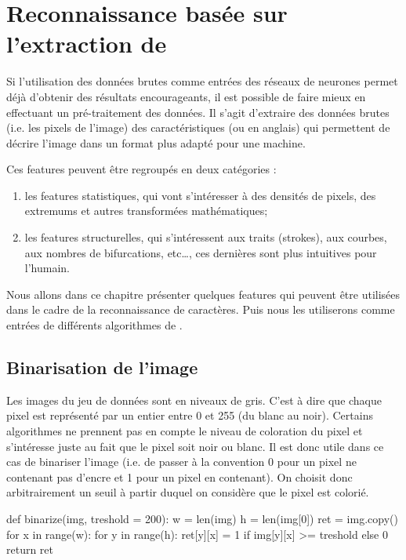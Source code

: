 
\chapter{Reconnaissance basée sur l'extraction de }
\label{chap:features}




Si l'utilisation des données brutes comme entrées des réseaux de neurones 
permet déjà d'obtenir des résultats encourageants, il est possible de faire 
mieux en effectuant un pré-traitement des données. 
Il s'agit d'extraire des données brutes (i.e.\/ les pixels de l'image) des 
caractéristiques (ou  en anglais) qui permettent de décrire 
l'image dans un format plus adapté pour une machine.

Ces features peuvent être regroupés en deux catégories : 
\begin{enumerate}
  \item les features statistiques, qui vont s'intéresser à des densités de pixels, 
  des extremums et autres transformées mathématiques;
  \item les features structurelles, qui s’intéressent aux traits (strokes), aux courbes,
  aux nombres de bifurcations, etc…, ces dernières sont plus intuitives pour l’humain.
\end{enumerate}

Nous allons dans ce chapitre présenter quelques features qui peuvent être 
utilisées dans le cadre de la reconnaissance de caractères. Puis nous les utiliserons 
comme entrées de différents algorithmes de .



\section{Binarisation de l'image}



Les images du jeu de données sont en niveaux de gris. 
C'est à dire que chaque pixel est représenté par un entier entre 0 
et 255 (du blanc au noir). 
Certains algorithmes ne prennent pas en compte le niveau de coloration 
du pixel et s'intéresse juste au fait que le pixel soit noir ou blanc. 
Il est donc utile dans ce cas de binariser l'image (i.e.\/ de passer 
à la convention 0 pour un pixel ne contenant pas d'encre et 1 pour 
un pixel en contenant). 
On choisit donc arbitrairement un seuil à partir duquel on considère que 
le pixel est colorié.

\begin{codeblock}
def binarize(img, treshold = 200):
    w = len(img)
    h = len(img[0])
    ret = img.copy()
    for x in range(w):
        for y in range(h):
            ret[y][x] = 1 if img[y][x] >= treshold else 0
    return ret
\end{codeblock}

